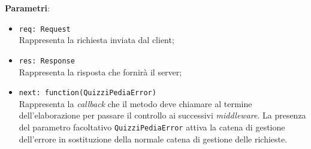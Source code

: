 \begin{itemize}
\begin{itemize}
		\textbf{Parametri}:
		 \begin{itemize}
		  \item
			\texttt{req: Request} \\
			Rappresenta la richiesta inviata dal client;
		  \item
			\texttt{res: Response} \\
			Rappresenta la risposta che fornirà il server;
		  \item
		    \texttt{next: function(QuizziPediaError)} \\
			Rappresenta la \textit{callback} che il metodo deve chiamare al termine dell'elaborazione per passare il controllo ai successivi \textit{middleware}. La presenza del parametro facoltativo \texttt{QuizziPediaError} attiva la catena di gestione dell'errore in sostituzione della normale catena di gestione delle richieste.
		 \end{itemize}
	\end{itemize}	 
\end{itemize}

